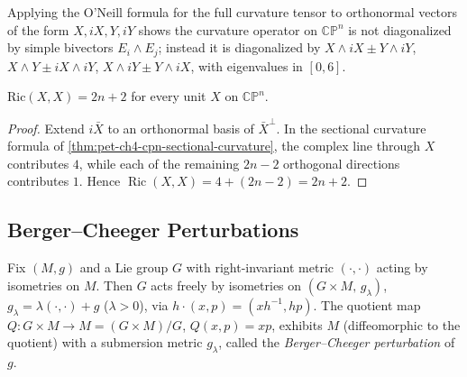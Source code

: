 \begin{remark}
  \label{rem:pet-ch4-cpn-curvature-operator-eigenbasis}

  Applying the O'Neill formula for the full curvature tensor to orthonormal
  vectors of the form $X,iX,Y,iY$ shows the curvature operator on $\mathbb{CP}^n$
  is not diagonalized by simple bivectors $E_i\wedge E_j$; instead it is
  diagonalized by
  $X\wedge iX\pm Y\wedge iY$, $X\wedge Y\pm iX\wedge iY$, $X\wedge iY\pm Y\wedge iX$,
  with eigenvalues in $[0,6]$.
\end{remark}

\begin{proposition}
  \label{prop:pet-ch4-cpn-einstein}

  $\mathrm{Ric}(X,X)=2n+2$ for every unit $X$ on $\mathbb{CP}^n$.
\end{proposition}
\begin{proof}
  \sketch
  Extend $i\bar X$ to an orthonormal basis of $\bar X^\perp$. In the sectional
  curvature formula of \cref{thm:pet-ch4-cpn-sectional-curvature}, the complex
  line through $X$ contributes $4$, while each of the remaining $2n-2$
  orthogonal directions contributes $1$. Hence
  $\operatorname{Ric}(X,X)=4+(2n-2)=2n+2$.
\end{proof}

\subsection{Berger--Cheeger Perturbations}

\begin{definition}
  \label{def:pet-ch4-berger-cheeger-construction}

  Fix $(M,g)$ and a Lie group $G$ with right-invariant metric $(\cdot,\cdot)$
  acting by isometries on $M$. Then $G$ acts freely by isometries on
  $(G\times M,\,g_\lambda)$, $g_\lambda=\lambda(\cdot,\cdot)+g$ ($\lambda>0$), via
  $h\cdot(x,p)=(xh^{-1},hp)$. The quotient map $Q:G\times M\to M=(G\times M)/G$,
  $Q(x,p)=xp$, exhibits $M$ (diffeomorphic to the quotient) with a submersion
  metric $g_\lambda$, called the \emph{Berger--Cheeger perturbation} of $g$.
\end{definition}

